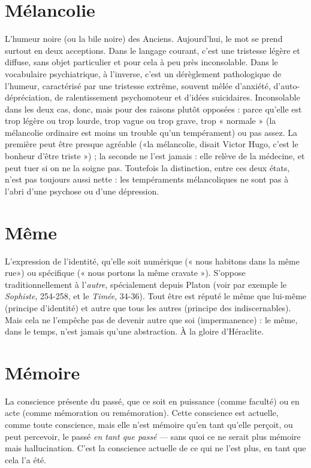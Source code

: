 \section{Mélancolie}
L’humeur noire (ou la bile noire) des Anciens. Aujourd’hui,
le mot se prend surtout en deux acceptions. Dans le
langage courant, c’est une tristesse légère et diffuse, sans objet particulier et
pour cela à peu près inconsolable. Dans le vocabulaire psychiatrique, à
l'inverse, c’est un dérèglement pathologique de l'humeur, caractérisé par une
tristesse extrême, souvent mêlée d’anxiété, d’auto-dépréciation, de ralentissement
psychomoteur et d’idées suicidaires. Inconsolable dans les deux cas, donc,
mais pour des raisons plutôt opposées : parce qu’elle est trop légère ou trop
lourde, trop vague ou trop grave, trop « normale » (la mélancolie ordinaire est
moins un trouble qu’un tempérament) ou pas assez. La première peut être
presque agréable («la mélancolie, disait Victor Hugo, c’est le bonheur d’être
triste ») ; la seconde ne l’est jamais : elle relève de la médecine, et peut tuer si
on ne la soigne pas. Toutefois la distinction, entre ces deux états, n’est pas toujours
aussi nette : les tempéraments mélancoliques ne sont pas à l'abri d’une
psychose ou d’une dépression.

\section{Même}
L'expression de l'identité, qu’elle soit numérique (« nous habitons
dans la même rue») ou spécifique (« nous portons la même
cravate »). S’oppose traditionnellement à l’{\it autre}, spécialement depuis Platon
(voir par exemple le {\it Sophiste}, 254-258, et le {\it Timée}, 34-36). Tout être est réputé
le même que lui-même (principe d’identité) et autre que tous les autres (principe
des indiscernables). Mais cela ne l'empêche pas de devenir autre que soi
(impermanence) : le même, dans le temps, n’est jamais qu’une abstraction. À la
gloire d'Héraclite.

\section{Mémoire}
La conscience présente du passé, que ce soit en puissance (comme
faculté) ou en acte (comme mémoration ou remémoration).
Cette conscience est actuelle, comme toute conscience, mais elle n’est mémoire
qu’en tant qu’elle perçoit, ou peut percevoir, le passé {\it en tant que passé} — sans
quoi ce ne serait plus mémoire mais hallucination. C’est la conscience actuelle
de ce qui ne l’est plus, en tant que cela l’a été.

